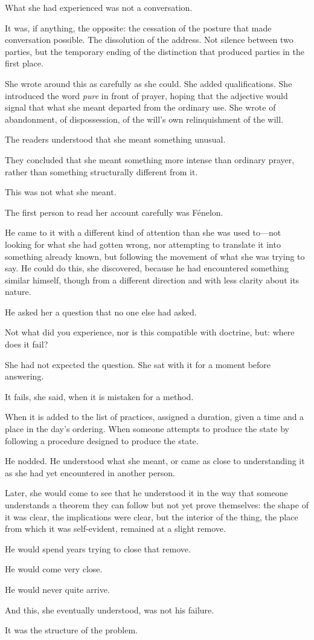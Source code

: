 What she had experienced was not a conversation.

It was, if anything, the opposite: the cessation of the
posture that made conversation possible. The dissolution of the
address. Not silence between two parties, but the temporary
ending of the distinction that produced parties in the first
place.

She wrote around this as carefully as she could. She added
qualifications. She introduced the word \textit{pure} in front of
prayer, hoping that the adjective would signal that what she
meant departed from the ordinary use. She wrote of abandonment,
of dispossession, of the will's own relinquishment of the will.

The readers understood that she meant something unusual.

They concluded that she meant something more intense than ordinary
prayer, rather than something structurally different from it.

This was not what she meant.

\scenebreak

The first person to read her account carefully was
F\'{e}nelon.

He came to it with a different kind of attention than she was
used to---not looking for what she had gotten wrong, nor
attempting to translate it into something already known, but
following the movement of what she was trying to say. He could
do this, she discovered, because he had encountered something
similar himself, though from a different direction and with less
clarity about its nature.

He asked her a question that no one else had asked.

Not what did you experience, nor is this compatible with
doctrine, but: where does it fail?

She had not expected the question. She sat with it for a moment
before answering.

It fails, she said, when it is mistaken for a method.

When it is added to the list of practices, assigned a duration,
given a time and a place in the day's ordering. When someone
attempts to produce the state by following a procedure designed
to produce the state.

He nodded. He understood what she meant, or came as close to
understanding it as she had yet encountered in another person.

Later, she would come to see that he understood it in the way
that someone understands a theorem they can follow but not
yet prove themselves: the shape of it was clear, the
implications were clear, but the interior of the thing, the
place from which it was self-evident, remained at a slight
remove.

He would spend years trying to close that remove.

He would come very close.

He would never quite arrive.

And this, she eventually understood, was not his failure.

It was the structure of the problem.
